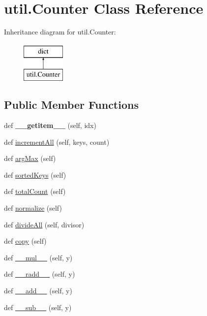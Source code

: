 \hypertarget{classutil_1_1_counter}{}\section{util.\+Counter Class Reference}
\label{classutil_1_1_counter}
Inheritance diagram for util.\+Counter\+:\begin{figure}[H]
\begin{center}
\leavevmode
\includegraphics[height=2.000000cm]{classutil_1_1_counter}
\end{center}
\end{figure}
\subsection*{Public Member Functions}
\begin{DoxyCompactItemize}
\item 
\mbox{\label{classutil_1_1_counter_a5adf33996410dfdeddfdb4d6d600a587}} 
def {\bfseries \+\_\+\+\_\+getitem\+\_\+\+\_\+} (self, idx)
\item 
def \hyperlink{classutil_1_1_counter_a92c9ebbb536e6febb2b2856f30f21804}{increment\+All} (self, keys, count)
\item 
def \hyperlink{classutil_1_1_counter_ac783df5e03c63469983b812fd5aff0c2}{arg\+Max} (self)
\item 
def \hyperlink{classutil_1_1_counter_a8e32d106f34cb7cd8341e78b49f5e40a}{sorted\+Keys} (self)
\item 
def \hyperlink{classutil_1_1_counter_a452a24a68fa547c7bf56e619be6bab6d}{total\+Count} (self)
\item 
def \hyperlink{classutil_1_1_counter_a5d3243989dde93af492d2a7618ea322f}{normalize} (self)
\item 
def \hyperlink{classutil_1_1_counter_a510574fa4c36d2d4c845b9f6ac5bc155}{divide\+All} (self, divisor)
\item 
def \hyperlink{classutil_1_1_counter_ac57004446c3d5a15948e7803a0af3d56}{copy} (self)
\item 
def \hyperlink{classutil_1_1_counter_a9f43e857acc90d489555652af32dcd1c}{\+\_\+\+\_\+mul\+\_\+\+\_\+} (self, y)
\item 
def \hyperlink{classutil_1_1_counter_a4d15b474f84349a6d6b0694066b16ac2}{\+\_\+\+\_\+radd\+\_\+\+\_\+} (self, y)
\item 
def \hyperlink{classutil_1_1_counter_ac9dfb7fe386dc63f8d27a66984d5bc75}{\+\_\+\+\_\+add\+\_\+\+\_\+} (self, y)
\item 
def \hyperlink{classutil_1_1_counter_a541fd5f4f74e910852c589ff23b4b280}{\+\_\+\+\_\+sub\+\_\+\+\_\+} (self, y)
\end{DoxyCompactItemize}


